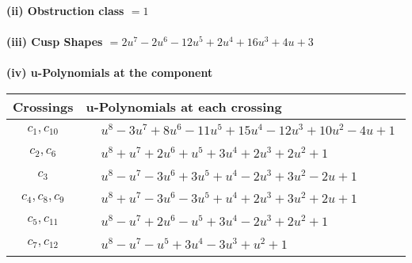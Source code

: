 \documentclass[1p]{elsarticle_modified}
\theoremstyle{definition}
\begin{document}
\flushleft \textbf{(ii) Obstruction class $= 1$}\\~\\
\flushleft \textbf{(iii) Cusp Shapes $= 2 u^7-2 u^6-12 u^5+2 u^4+16 u^3+4 u+3$}\\~\\
\newpage\renewcommand{\arraystretch}{1}
\flushleft \textbf{(iv) u-Polynomials at the component}\newline \\
\begin{tabular}{m{50pt}|m{274pt}}
Crossings & \hspace{64pt}u-Polynomials at each crossing \\
\hline $$\begin{aligned}c_{1},c_{10}\end{aligned}$$&$\begin{aligned}
&u^8-3 u^7+8 u^6-11 u^5+15 u^4-12 u^3+10 u^2-4 u+1
\end{aligned}$\\
\hline $$\begin{aligned}c_{2},c_{6}\end{aligned}$$&$\begin{aligned}
&u^8+u^7+2 u^6+u^5+3 u^4+2 u^3+2 u^2+1
\end{aligned}$\\
\hline $$\begin{aligned}c_{3}\end{aligned}$$&$\begin{aligned}
&u^8- u^7-3 u^6+3 u^5+u^4-2 u^3+3 u^2-2 u+1
\end{aligned}$\\
\hline $$\begin{aligned}c_{4},c_{8},c_{9}\end{aligned}$$&$\begin{aligned}
&u^8+u^7-3 u^6-3 u^5+u^4+2 u^3+3 u^2+2 u+1
\end{aligned}$\\
\hline $$\begin{aligned}c_{5},c_{11}\end{aligned}$$&$\begin{aligned}
&u^8- u^7+2 u^6- u^5+3 u^4-2 u^3+2 u^2+1
\end{aligned}$\\
\hline $$\begin{aligned}c_{7},c_{12}\end{aligned}$$&$\begin{aligned}
&u^8- u^7- u^5+3 u^4-3 u^3+u^2+1
\end{aligned}$\\
\hline
\end{tabular}\\~\\
\end{document}
